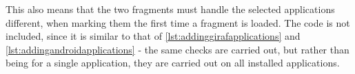 This also means that the two fragments must handle the selected applications different, when marking them the first time a fragment is loaded.
The code is not included, since it is similar to that of \cref{lst:addinggirafapplications} and \cref{lst:addingandroidapplications} - the same checks are carried out, but rather than being for a single application, they are carried out on all installed applications.